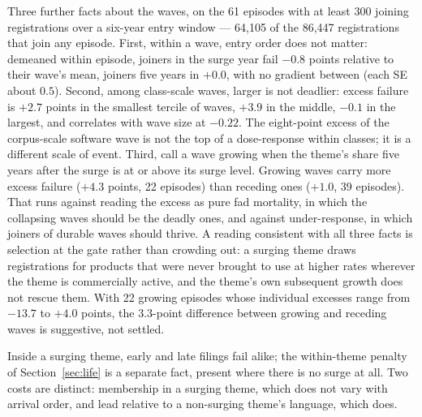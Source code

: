 Three further facts about the waves, on the 61 episodes with at least 300
joining registrations over a six-year entry window --- 64{,}105 of the
86{,}447 registrations that join any episode.
First, within a wave, entry order does not matter: demeaned within episode,
joiners in the surge year fail $-0.8$ points relative to their wave's mean,
joiners five years in $+0.0$, with no gradient between (each SE about
$0.5$). Second, among class-scale waves, larger is not deadlier: excess
failure is $+2.7$ points in the smallest tercile of waves, $+3.9$ in the
middle, $-0.1$ in the largest, and correlates with wave size at $-0.22$.
The eight-point excess of the corpus-scale software wave is not the top of
a dose-response within classes; it is a different scale of event. Third,
call a wave growing when the theme's share five years after the surge is
at or above its surge level. Growing waves carry more excess failure
($+4.3$ points, 22 episodes) than receding ones ($+1.0$, 39 episodes).
That runs against reading the excess as pure fad mortality, in which the
collapsing waves should be the deadly ones, and against under-response, in
which joiners of durable waves should thrive. A reading consistent with all
three facts is selection at the gate rather than crowding out: a surging
theme draws registrations for products that were never brought to use at
higher rates wherever the theme is commercially active, and the theme's
own subsequent growth does not rescue them. With 22 growing episodes whose
individual excesses range from $-13.7$ to $+4.0$ points, the $3.3$-point
difference between growing and receding waves is suggestive, not settled.

Inside a surging theme, early and late filings fail alike; the
within-theme penalty of Section~\ref{sec:life} is a separate fact, present
where there is no surge at all. Two costs are distinct: membership in a
surging theme, which does not vary with arrival order, and lead relative
to a non-surging theme's language, which does.
